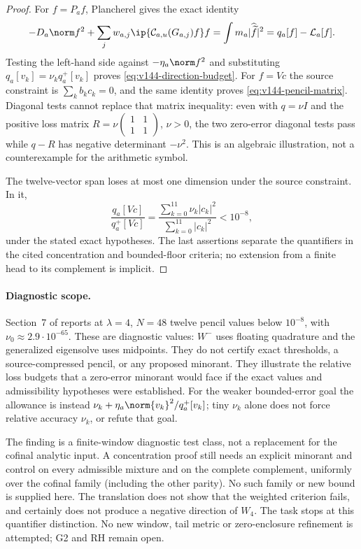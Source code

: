 \begin{proof}
For $f=P_af$, Plancherel gives the exact identity
\[
 -D_a\norm f^2+\sum_jw_{a,j}
       \ip{\mathcal C_{a,u}(G_{a,j})f}f
 =\int m_a|\widehat{\widetilde f}|^2
 =q_a[f]-\mathcal L_a[f].
\]
Testing the left-hand side against $-\eta_a\norm f^2$ and substituting
$q_a[v_k]=\nu_kq_a^+[v_k]$ proves
\eqref{eq:v144-direction-budget}. For $f=Vc$ the source constraint is
$\sum_kb_kc_k=0$, and the same identity proves
\eqref{eq:v144-pencil-matrix}. Diagonal tests cannot replace that
matrix inequality: even with $q=\nu I$ and the positive loss matrix
$R=\nu\left(\begin{smallmatrix}1&1\\1&1\end{smallmatrix}\right)$,
$\nu>0$, the two zero-error diagonal tests pass while $q-R$ has
negative determinant $-\nu^2$. This is an algebraic illustration,
not a counterexample for the arithmetic symbol.

The twelve-vector span loses at most one dimension under the source
constraint. In it,
\[
 \frac{q_a[Vc]}{q_a^+[Vc]}
   =\frac{\sum_{k=0}^{11}\nu_k|c_k|^2}
          {\sum_{k=0}^{11}|c_k|^2}<10^{-8},
\]
under the stated exact hypotheses. The last assertions separate the
quantifiers in the cited concentration and bounded-floor criteria;
no extension from a finite head to its complement is implicit.
\end{proof}

\paragraph{Diagnostic scope.}
Section~7 of  reports
at $\lambda=4$, $N=48$ twelve pencil values below $10^{-8}$, with
$\nu_0\approx2.9\cdot10^{-65}$. These are diagnostic values:
$W^-$ uses floating quadrature and the generalized eigensolve uses
midpoints. They do not certify exact thresholds, a source-compressed
pencil, or any proposed minorant. They illustrate the relative
loss budgets that a zero-error minorant would face if the exact
values and admissibility hypotheses were established.
For the weaker bounded-error goal the allowance is instead
$\nu_k+\eta_a\norm{v_k}^2/q_a^+[v_k]$; tiny $\nu_k$ alone does not
force relative accuracy $\nu_k$, or refute that goal.

The finding is a finite-window diagnostic test class, not a replacement
for the cofinal analytic input. A concentration proof still needs an
explicit minorant and control on every admissible mixture and on the
complete complement, uniformly over the cofinal family (including the
other parity). No such family or new bound is supplied here. The
translation does not show that the weighted criterion fails, and
certainly does not produce a negative direction of $W_4$. The task
stops at this quantifier distinction. No new window, tail metric or
zero-enclosure refinement is attempted; G2 and RH remain open.
